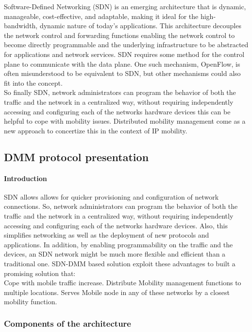 \documentclass{article}
\begin{document}
Software-Defined Networking (SDN) is an emerging architecture that is
dynamic, manageable, cost-effective, and adaptable, making it ideal
for the high-bandwidth, dynamic nature of today's applications. This
architecture decouples the network control and forwarding functions
enabling the network control to become directly programmable and the
underlying infrastructure to be abstracted for applications and
network services.  SDN requires some method for the control plane to
communicate with the data plane. One such mechanism, OpenFlow, is
often misunderstood to be equivalent to SDN, but other mechanisms
could also fit into the concept.\\
\newline
So finally SDN, network administrators can program the behavior of
both the traffic and the network in a centralized way, without
requiring independently accessing and configuring each of the networks
hardware devices this can be helpful to cope with mobility
issues. Distributed mobility management come as a new approach to
concertize this in the context of IP mobility.


\subsection{DMM protocol presentation}

\paragraph{Introduction}
SDN allows allows for quicker provisioning and configuration of
network connections. So, network administrators can program the
behavior of both the traffic and the network in a centralized way,
without requiring independently accessing and configuring each of the
networks hardware devices. Also, this simplifies networking as well as
the deployment of new protocols and applications. In addition, by
enabling programmability on the traffic and the devices, an SDN
network might be much more flexible and efficient than a traditional
one. SDN-DMM based solution exploit these advantages to built a
promising solution that:\\
\newline
Cope with mobile traffic increase.  Distribute Mobility management
functions to multiple locations.  Serves Mobile node in any of these
networks by a closest mobility function.

\subsubsection{Components of the architecture}
\end{document}
